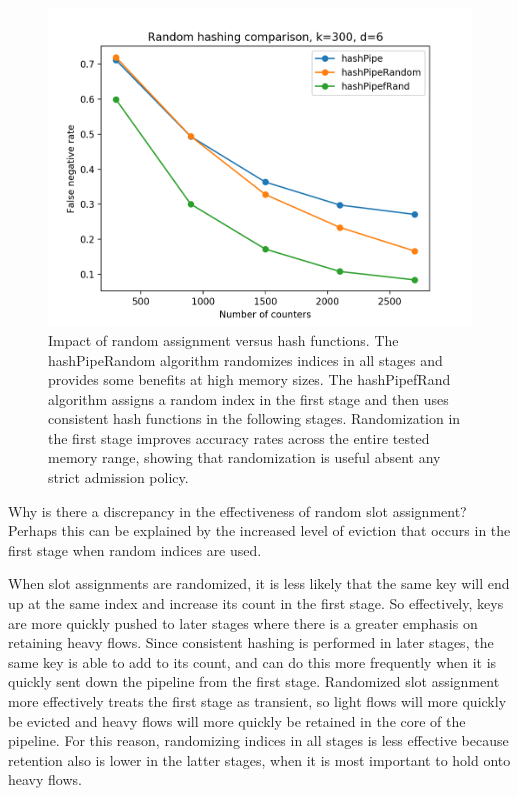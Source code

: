 \begin{figure}[t]
  \centering
    \includegraphics[scale=0.5]{interview}
     \caption{Impact of random assignment versus hash functions. The hashPipeRandom algorithm randomizes indices in all stages and provides some benefits at high memory sizes. The hashPipefRand algorithm assigns a random index in the first stage and then uses consistent hash functions in the following stages. Randomization in the first stage improves accuracy rates across the entire tested memory range, showing that randomization is useful absent any strict admission policy.}
     \label{fig:interview}
\end{figure}
Why is there a discrepancy in the effectiveness of random slot assignment? Perhaps this can be explained by the increased level of eviction that occurs in the first stage when random indices are used. 

When slot assignments are randomized, it is less likely that the same key will end up at the same index and increase its count in the first stage. So effectively, keys are more quickly pushed to later stages where there is a greater emphasis on retaining heavy flows. Since consistent hashing is performed in later stages, the same key is able to add to its count, and can do this more frequently when it is quickly sent down the pipeline from the first stage. Randomized slot assignment more effectively treats the first stage as transient, so light flows will more quickly be evicted and heavy flows will more quickly be retained in the core of the pipeline. For this reason, randomizing indices in all stages is less effective because retention also is lower in the latter stages, when it is most important to hold onto heavy flows. 

